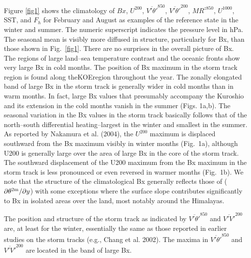\documentclass{ametsoc}
\begin{document}
Figure \ref{fig1} shows the climatology of $Bx$, $U^{200}$,
$\overline{V'\theta'}^{850}$, $\overline{V'\theta'}^{200}$, 
$MR^{z850}$, $U^{1000}$, SST, and $F_h$ for February and
August as examples of the reference state in the winter
and summer. The numeric superscript indicates the pressure
level in hPa. The seasonal mean is visibly more
diffused in structure, particularly for Bx, than those
shown in Fig.~\ref{fig1}. There are no surprises in the overall
picture of Bx. The regions of large land--sea temperature
contrast and the oceanic fronts show very large Bx in cold
months. The position of Bx maximum in the storm track
region is found along theKOEregion throughout the year.
The zonally elongated band of large Bx in the storm track
is generally wider in cold months than in warm months.
In fact, large Bx values that presumably accompany the
Kuroshio and its extension in the cold months vanish in
the summer (Figs. 1a,b). The seasonal variation in the Bx
values in the storm track basically follows that of the
north--south differential heating--largest in the winter and
smallest in the summer. As reported by Nakamura et al.
(2004), the $U^{200}$ maximum is displaced southward from the
Bx maximum visibly in winter months (Fig.~1a), although
U200 is generally large over the area of large Bx in the core
of the storm track. The southward displacement of the
U200 maximum from the Bx maximum in the storm track
is less pronounced or even reversed in warmer months
(Fig.~1b). We note that the structure of the climatological
Bx generally reflects those of ($\partial{\theta^{2{\textrm m}}}/\partial{y}$) with some exceptions where
the surface slope contributes significantly to Bx
in isolated areas over the land, most notably around the
Himalayas.

The position and structure of the storm track as indicated
by $\overline{V'\theta'}^{850}$
and $\overline{V'V'}^{200}$
are, at least for the winter,
essentially the same as those reported in earlier studies on
the storm tracks (e.g., Chang et al. 2002). The maxima in
$\overline{V'\theta'}^{850}$
and $\overline{V'V'}^{200}$ are located in the band of large Bx.
\end{document}

